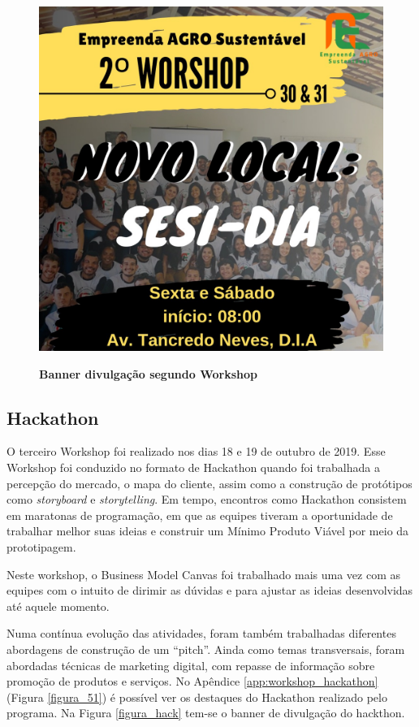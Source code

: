 \begin{figure}[H]
\centering
\caption{\textbf{Banner divulgação segundo Workshop}}
\includegraphics[scale=0.23]{Imagens/2_workshop.jpg}
\label{divulgacao_segundo}
\end{figure}

\subsection{Hackathon}

O terceiro Workshop foi realizado nos dias 18 e 19 de outubro de 2019. Esse Workshop foi conduzido no formato de Hackathon quando foi trabalhada a percepção do mercado, o mapa do cliente, assim como a construção de protótipos como \textit{storyboard} e \textit{storytelling}. Em tempo, encontros como Hackathon consistem em maratonas de programação, em que as equipes tiveram a oportunidade de trabalhar melhor suas ideias e construir um Mínimo Produto Viável por meio da prototipagem.

Neste workshop, o Business Model Canvas foi trabalhado mais uma vez com as equipes com o intuito de dirimir as dúvidas e para ajustar as ideias desenvolvidas até aquele momento.

Numa contínua evolução das atividades, foram também trabalhadas diferentes abordagens de construção de um “pitch”. Ainda como temas transversais, foram abordadas técnicas de marketing digital, com repasse de informação sobre promoção de produtos e serviços. No Apêndice \ref{app:workshop_hackathon} (Figura \ref{figura_51}) é possível ver os destaques do Hackathon realizado pelo programa. Na Figura \ref{figura_hack} tem-se o banner de divulgação do hackthon.

